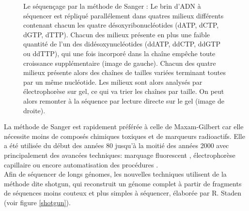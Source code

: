 \begin{figure}[H]
\begin{center}
\caption[Séquencer par la méthode de Sanger]{Le séquençage par la méthode de Sanger : Le brin d'ADN à séquencer est répliqué parallélement dans quatres milieux différents contenant chacun les quatre désoxyribonucléotides (dATP, dCTP, dGTP, dTTP). Chacun des milieux présente en plus une faible quantité de l'un des didésoxynucléotides (ddATP, ddCTP, ddGTP ou ddTTP), qui une fois incorporé dans la cha\^{i}ne empêche toute croissance supplémentaire (image de gauche). Chacun des quatre milieux présente alors des cha\^{i}nes de tailles variées terminant toutes par un même nucléotide. Les milieux sont alors analysés par électrophorèse sur gel, ce qui va trier les cha\^{i}nes par taille. On peut alors remonter à la séquence par lecture directe sur le gel (image de droite).}
\label{sangermethod}
\end{center}
\end{figure}



 
 La méthode de Sanger est rapidement préférée à celle de Maxam-Gilbert car elle nécessite moins de composés chimiques toxiques et de marqueurs radioactifs. Elle a été utilisée du début des années 80 jusqu'à la moitié des années 2000 avec principalement des avancées techniques:  marquage fluorescent \cite{Prober1987}, électrophorèse capillaire \cite{Swerdlow1991} ou encore automatisation des procédures \cite{Hunkapiller1991}.\\
 
  Afin de séquencer de longs génomes, les nouvelles techniques utilisent de la méthode dite shotgun, qui reconstruit un génome complet à partir de fragments de séquences moins couteux et plus simples à séquencer, élaborée par R. Staden \cite{Staden1979} (voir figure \ref{shotgun}).
 


